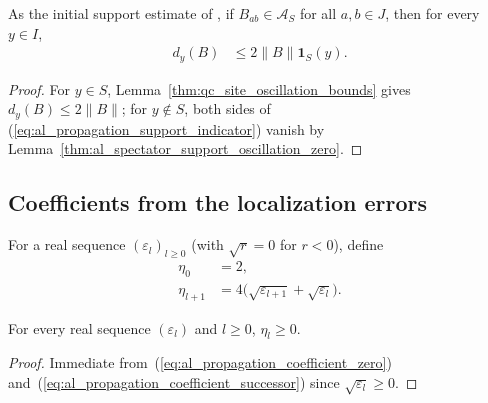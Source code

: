 \begin{lemma}
    \label{thm:al_spectator_support_indicator}
    \leanok
    As the initial support estimate of
    \cite[Section~10]{OpenAI2026AreaLaw}, if $B_{ab}\in\mathcal A_S$ for all
    $a,b\in J$, then for every $y\in I$,
    \begin{align}
        d_y(B) & \le2\|B\|\mathbf1_S(y).
        \label{eq:al_propagation_support_indicator}
    \end{align}
\end{lemma}
\begin{proof}
    \leanok
    For $y\in S$, Lemma~\ref{thm:qc_site_oscillation_bounds} gives
    $d_y(B)\le2\|B\|$; for $y\notin S$, both sides of
    (\ref{eq:al_propagation_support_indicator}) vanish by
    Lemma~\ref{thm:al_spectator_support_oscillation_zero}.
\end{proof}

\subsection{Coefficients from the localization errors}

\begin{definition}
    \label{def:al_channel_shell_coefficient}
    \leanok
    For a real sequence $(\varepsilon_l)_{l\ge0}$ (with $\sqrt{r}=0$ for
    $r<0$), define
    \begin{align}
        \eta_0     & =2, \label{eq:al_propagation_coefficient_zero} \\
        \eta_{l+1} & =4\bigl(\sqrt{\varepsilon_{l+1}}
        +\sqrt{\varepsilon_l}\bigr).
        \label{eq:al_propagation_coefficient_successor}
    \end{align}
\end{definition}

\begin{lemma}
    \label{thm:al_channel_shell_coefficient_nonneg}
    \leanok
    For every real sequence $(\varepsilon_l)$ and $l\ge0$, $\eta_l\ge0$.
\end{lemma}
\begin{proof}
    \leanok
    Immediate from~(\ref{eq:al_propagation_coefficient_zero})
    and~(\ref{eq:al_propagation_coefficient_successor}) since
    $\sqrt{\varepsilon_l}\ge0$.
\end{proof}

